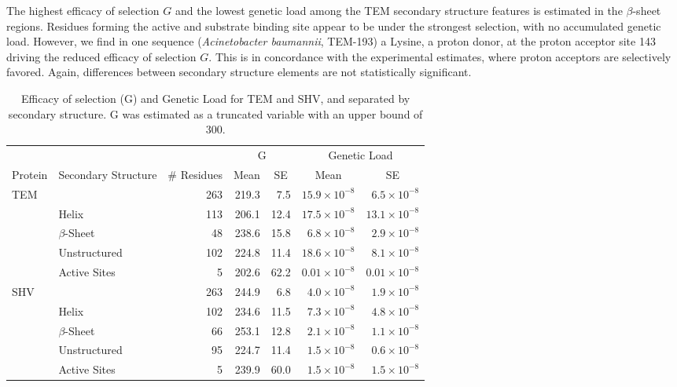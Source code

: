 The highest efficacy of selection $G$ and the lowest genetic load among the TEM secondary structure features is estimated in the $\beta$-sheet regions.
Residues forming the active and substrate binding site appear to be under the strongest selection, with no accumulated genetic load.
However, we find in one sequence (\textit{Acinetobacter baumannii}, TEM-193) a Lysine, a proton donor, at the proton acceptor site 143 driving the reduced efficacy of selection $G$. 
This is in concordance with the experimental estimates, where proton acceptors are selectively favored.
Again, differences between secondary structure elements are not statistically significant.

\begin{table}
  \centering
  \begin{tabular}{llrrrrr}
    & & & \multicolumn{2}{c}{G} & \multicolumn{2}{c}{Genetic Load} \\ 
    Protein & Secondary Structure & \# Residues	& \multicolumn{1}{c}{Mean} & \multicolumn{1}{c}{SE} & \multicolumn{1}{c}{Mean} & \multicolumn{1}{c}{SE} \\ \hline 
    TEM	&		& 263 & 219.3 & 7.5  & $15.9\times10^{-8}$ & $6.5\times10^{-8}$ \\
    &Helix 		& 113 & 206.1 & 12.4 & $17.5\times10^{-8}$ & $13.1\times10^{-8}$ \\
    &$\beta$-Sheet 	&  48 & 238.6 & 15.8 & $ 6.8\times10^{-8}$ & $2.9\times10^{-8}$ \\
    &Unstructured 	& 102 & 224.8 & 11.4 & $18.6\times10^{-8}$ & $8.1\times10^{-8}$ \\
    &Active Sites 	&   5 & 202.6 & 62.2 & $0.01\times10^{-8}$& $0.01\times10^{-8}$ \\ \hline
    
    SHV&		& 263 & 244.9 & 6.8  & $4.0\times10^{-8}$ & $1.9\times10^{-8}$ \\
    &Helix		& 102 & 234.6 & 11.5 & $7.3\times10^{-8}$ & $4.8\times10^{-8}$ \\
    &$\beta$-Sheet 	&  66 & 253.1 & 12.8 & $2.1\times10^{-8}$ & $1.1\times10^{-8}$ \\
    &Unstructured	&  95 & 224.7 & 11.4 & $1.5\times10^{-8}$ & $0.6\times10^{-8}$  \\
    &Active Sites	&   5 & 239.9 & 60.0 & $1.5\times10^{-8}$ & $1.5\times10^{-8}$ \\

  \end{tabular}
  \caption{Efficacy of selection (G) and Genetic Load for TEM and SHV, and separated by secondary structure. G was estimated as a truncated variable with an upper bound of 300.}
  \label{tab:selection}
\end{table}

